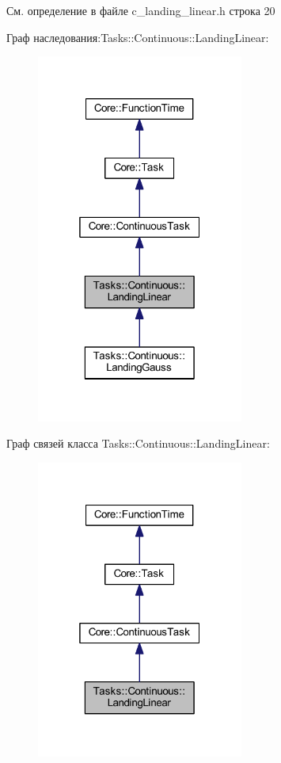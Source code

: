 См. определение в файле c\+\_\+landing\+\_\+linear.\+h строка 20



Граф наследования\+:Tasks\+:\+:Continuous\+:\+:Landing\+Linear\+:
\nopagebreak
\begin{figure}[H]
\begin{center}
\leavevmode
\includegraphics[width=193pt]{class_tasks_1_1_continuous_1_1_landing_linear__inherit__graph}
\end{center}
\end{figure}


Граф связей класса Tasks\+:\+:Continuous\+:\+:Landing\+Linear\+:
\nopagebreak
\begin{figure}[H]
\begin{center}
\leavevmode
\includegraphics[width=193pt]{class_tasks_1_1_continuous_1_1_landing_linear__coll__graph}
\end{center}
\end{figure}



